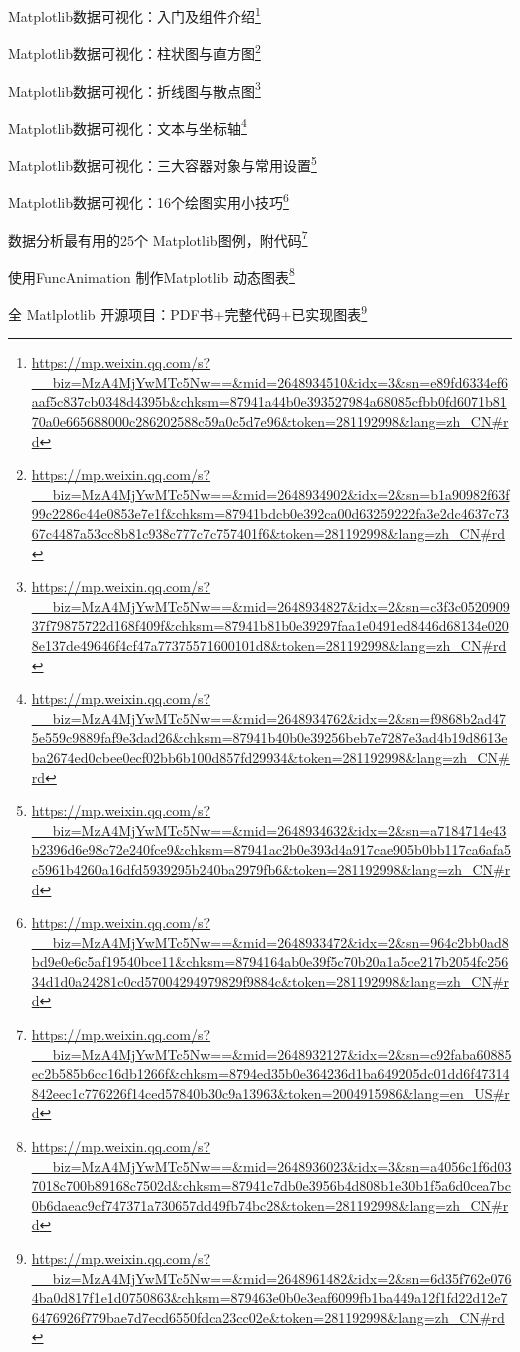 \documentclass[]{ctexbook}
\renewcommand{\href}[2]{#2\footnote{\url{#1}}}
\begin{document}
\href{https://mp.weixin.qq.com/s?__biz=MzA4MjYwMTc5Nw==\&mid=2648934510\&idx=3\&sn=e89fd6334ef6aaf5c837cb0348d4395b\&chksm=87941a44b0e393527984a68085cfbb0fd6071b8170a0e665688000c286202588c59a0c5d7e96\&token=281192998\&lang=zh_CN\#rd}{Matplotlib数据可视化：入门及组件介绍}

\href{https://mp.weixin.qq.com/s?__biz=MzA4MjYwMTc5Nw==\&mid=2648934902\&idx=2\&sn=b1a90982f63f99c2286c44e0853e7e1f\&chksm=87941bdcb0e392ca00d63259222fa3e2dc4637c7367c4487a53cc8b81c938c777c7c757401f6\&token=281192998\&lang=zh_CN\#rd}{Matplotlib数据可视化：柱状图与直方图}

\href{https://mp.weixin.qq.com/s?__biz=MzA4MjYwMTc5Nw==\&mid=2648934827\&idx=2\&sn=c3f3c052090937f79875722d168f409f\&chksm=87941b81b0e39297faa1e0491ed8446d68134e0208e137de49646f4cf47a77375571600101d8\&token=281192998\&lang=zh_CN\#rd}{Matplotlib数据可视化：折线图与散点图}

\href{https://mp.weixin.qq.com/s?__biz=MzA4MjYwMTc5Nw==\&mid=2648934762\&idx=2\&sn=f9868b2ad475e559c9889faf9e3dad26\&chksm=87941b40b0e39256beb7e7287e3ad4b19d8613eba2674ed0cbee0ecf02bb6b100d857fd29934\&token=281192998\&lang=zh_CN\#rd}{Matplotlib数据可视化：文本与坐标轴}

\href{https://mp.weixin.qq.com/s?__biz=MzA4MjYwMTc5Nw==\&mid=2648934632\&idx=2\&sn=a7184714e43b2396d6e98c72e240fce9\&chksm=87941ac2b0e393d4a917cae905b0bb117ca6afa5c5961b4260a16dfd5939295b240ba2979fb6\&token=281192998\&lang=zh_CN\#rd}{Matplotlib数据可视化：三大容器对象与常用设置}

\href{https://mp.weixin.qq.com/s?__biz=MzA4MjYwMTc5Nw==\&mid=2648933472\&idx=2\&sn=964c2bb0ad8bd9e0e6c5af19540bce11\&chksm=8794164ab0e39f5c70b20a1a5ce217b2054fc25634d1d0a24281c0cd57004294979829f9884c\&token=281192998\&lang=zh_CN\#rd}{​Matplotlib数据可视化：16个绘图实用小技巧}

\href{https://mp.weixin.qq.com/s?__biz=MzA4MjYwMTc5Nw==\&mid=2648932127\&idx=2\&sn=c92faba60885ec2b585b6cc16db1266f\&chksm=8794ed35b0e364236d1ba649205dc01dd6f47314842eec1c776226f14ced57840b30c9a13963\&token=2004915986\&lang=en_US\#rd}{数据分析最有用的25个 Matplotlib图例，附代码}

\href{https://mp.weixin.qq.com/s?__biz=MzA4MjYwMTc5Nw==\&mid=2648936023\&idx=3\&sn=a4056c1f6d037018c700b89168c7502d\&chksm=87941c7db0e3956b4d808b1e30b1f5a6d0cea7bc0b6daeac9cf747371a730657dd49fb74bc28\&token=281192998\&lang=zh_CN\#rd}{使用FuncAnimation 制作Matplotlib 动态图表}

\href{https://mp.weixin.qq.com/s?__biz=MzA4MjYwMTc5Nw==\&mid=2648961482\&idx=2\&sn=6d35f762e0764ba0d817f1e1d0750863\&chksm=879463e0b0e3eaf6099fb1ba449a12f1fd22d12e76476926f779bae7d7ecd6550fdca23cc02e\&token=281192998\&lang=zh_CN\#rd}{全 Matlplotlib 开源项目：PDF书+完整代码+已实现图表}
\end{document}
